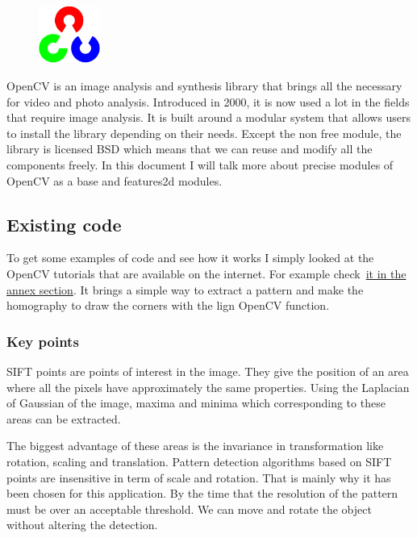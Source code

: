 		\begin{figure}
	\vspace{-7mm}
	\includegraphics[width=2cm]{images_not_compressed/opencv_logo.png}
	\end{figure}
	\par OpenCV is an image analysis and synthesis library that brings all the necessary for video and photo analysis. Introduced in 2000, it is now used a lot in the fields that require image analysis.
 It is built around a modular system that allows users to install the library depending on their needs.
 Except the non free module, the library is licensed BSD which means that we can reuse and modify all the components freely.
 In this document I will talk more about precise modules of OpenCV as a base and features2d modules.
	
	\subsection{Existing code}
	
	\par To get some examples of code and see how it works I simply looked at the OpenCV tutorials that are available on the internet. For example check~\hyperlink{opencv}{it in the annex section}. It brings a simple way to extract a pattern and make the homography to draw the corners with the lign OpenCV function.
	
	\subsubsection{Key points}
	\par SIFT points are points of interest in the image. They give the position of an area where all the pixels have approximately the same properties. Using the Laplacian of Gaussian of the image, maxima and minima which corresponding to these areas can be extracted.
	\par The biggest advantage of these areas is the invariance in transformation like rotation, scaling and translation. Pattern detection algorithms based on SIFT points are insensitive in term of scale and rotation. That is mainly why it has been chosen for this application. By the time that the resolution of the pattern must be over an acceptable threshold. We can move and rotate the object without altering the detection.
	

